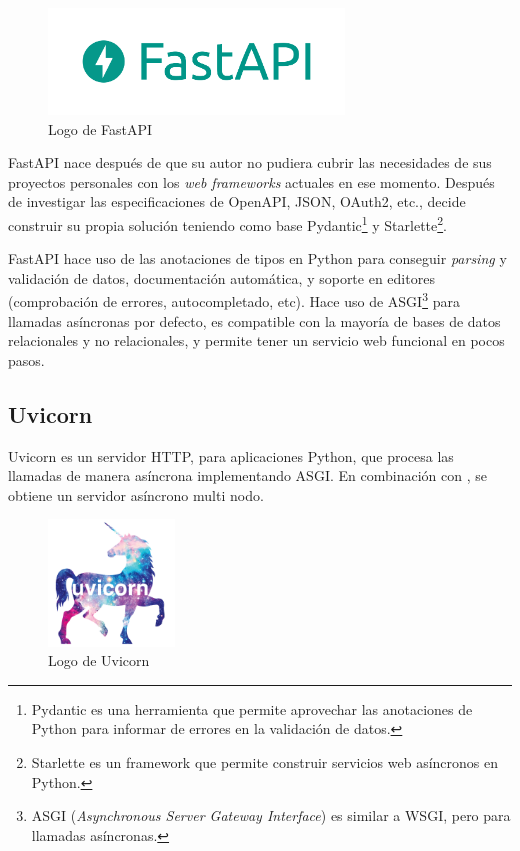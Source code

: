 \begin{figure}[ht]
    \centering
    \includegraphics[width=0.7\textwidth]{Figures/fastapi-logo}
    \decoRule
    \caption[FastAPI (Logo)]{Logo de FastAPI \emph{\parencite{Reference14}}}
    \label{fig:fastapi-logo}
\end{figure}

FastAPI nace después de que su autor no pudiera cubrir las necesidades de sus proyectos personales con los \emph{web frameworks} actuales en ese momento. Después de investigar las especificaciones de OpenAPI, JSON, OAuth2, etc., decide construir su propia solución teniendo como base Pydantic\footnote{Pydantic es una herramienta que permite aprovechar las anotaciones de Python para informar de errores en la validación de datos.} y Starlette\footnote{Starlette es un framework que permite construir servicios web asíncronos en Python.}. \emph{\parencite{Reference15}}

FastAPI hace uso de las anotaciones de tipos en Python para conseguir \emph{parsing} y validación de datos, documentación automática, y soporte en editores (comprobación de errores, autocompletado, etc). Hace uso de ASGI\footnote{ASGI (\emph{Asynchronous Server Gateway Interface}) es similar a WSGI, pero para llamadas asíncronas.} para llamadas asíncronas por defecto, es compatible con la mayoría de bases de datos relacionales y no relacionales, y permite tener un servicio web funcional en pocos pasos. \emph{\parencite{Reference14}}

\subsection{Uvicorn}

Uvicorn es un servidor HTTP, para aplicaciones Python, que procesa las llamadas de manera asíncrona implementando ASGI. En combinación con , se obtiene un servidor asíncrono multi nodo. \emph{\parencite{Reference16}}

\begin{figure}[ht]
    \centering
    \includegraphics[width=0.3\textwidth]{Figures/uvicorn-logo}
    \decoRule
    \caption[Uvicorn (Logo)]{Logo de Uvicorn \emph{\parencite{Reference16}}}
    \label{fig:uvicorn-logo}
\end{figure}

